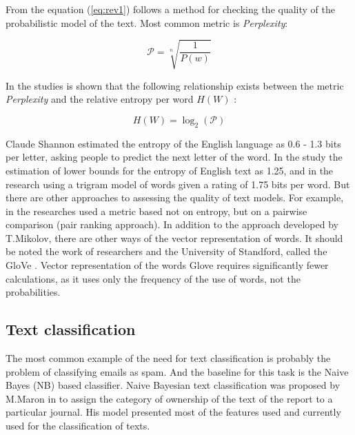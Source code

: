 \documentclass[12pt]{report}
\theoremstyle{definition}
\begin{document}
From the equation (\ref{eq:rev1}) follows a method for checking the quality of the probabilistic model of the text.
Most common  metric is \textit{Perplexity}:

\begin{equation}\label{eq:rev2}
	\mathcal{P}  = \sqrt[n]{\frac{1}{P(w)}}
\end{equation}

In the studies \cite{cover1991entropy, algoet1988asymptotic}  is shown that the following relationship exists between the metric \textit{Perplexity} and the relative entropy per word $ H(W)$ :

\begin{equation}\label{eq:rev3}
	H(W) = \log_2  \left( \mathcal{P} \right)
\end{equation}

Claude Shannon \cite{shannon1951prediction} estimated the entropy of the English language as 0.6 - 1.3 bits per letter, asking people to predict the next letter of the word. 
In the study \cite{cover1978convergent} the estimation of lower bounds for the entropy of English text as 1.25, and in the research \cite{brown1992estimate} using a trigram model of words given a rating of 1.75 bits per word.  
But there are other approaches to assessing the quality of text models. 
For example, in the researches \cite{cohen1998learning, collobert2011natural} used a metric based not on entropy, but on a pairwise comparison (pair ranking approach).
In addition to the approach developed by T.Mikolov, there are other ways of the vector representation of words. 
It should be noted the work of researchers and the University of Standford, called the GloVe \cite{pennington2014glove}. 
Vector representation of the words Glove requires significantly fewer calculations, as it uses only the frequency of the use of words, not the probabilities.

\subsection{Text classification}
\label{sec:textclassification}

The most common example of the need for text classification is probably the problem of classifying emails as spam. 
And the baseline for this task is the Naive Bayes (NB) based classifier.
Naive Bayesian text classification was proposed by M.Maron in \cite{maron1961automatic} to assign the category of ownership of the text of the report to a particular journal.
His model presented most of the features used and currently used for the classification of texts.
\end{document}
